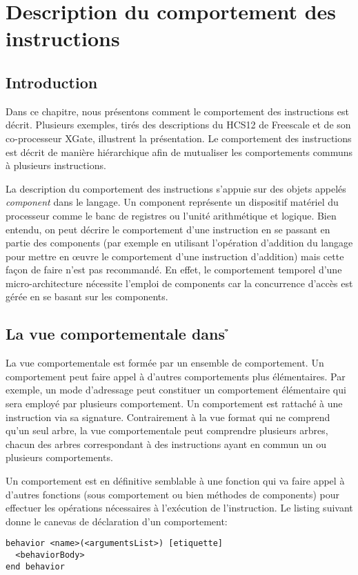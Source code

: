 \chapter[Description du comportement]{Description du comportement des instructions}
\label{chap:behavior}
\section{Introduction}

Dans ce chapitre, nous présentons comment le comportement des instructions est décrit. Plusieurs exemples, tirés des descriptions du HCS12 de Freescale et de son co-processeur XGate, illustrent la présentation. Le comportement des instructions est décrit de manière hiérarchique afin de mutualiser les comportements communs à plusieurs instructions.

La description du comportement des instructions s'appuie sur des objets appelés {\em component} dans le langage. Un component représente un dispositif matériel du processeur comme le banc de registres ou l'unité arithmétique et logique. Bien entendu, on peut décrire le comportement d'une instruction en se passant en partie des components (par exemple en utilisant l'opération d'addition du langage pour mettre en œuvre le comportement d'une instruction d'addition) mais cette façon de faire n'est pas recommandé. En effet, le comportement temporel d'une micro-architecture nécessite l'emploi de components car la concurrence d'accès est gérée en se basant sur les components.

\section{La vue comportementale dans \h}

La vue comportementale est formée par un ensemble de comportement. Un comportement peut faire appel à d'autres comportements plus élémentaires. Par exemple, un mode d'adressage peut constituer un comportement élémentaire qui sera employé par plusieurs comportement. Un comportement est rattaché à une instruction via sa signature. Contrairement à la vue format qui ne comprend qu'un seul arbre, la vue comportementale peut comprendre plusieurs arbres, chacun des arbres correspondant à des instructions ayant en commun un ou plusieurs comportements.

Un comportement est en définitive semblable à une fonction qui va faire appel à d'autres fonctions (sous comportement ou bien méthodes de components) pour effectuer les opérations nécessaires à l'exécution de l'instruction. Le listing suivant donne le canevas de déclaration d'un comportement:
\begin{lstlisting}
behavior <name>(<argumentsList>) [etiquette]
  <behaviorBody>
end behavior
\end{lstlisting}

